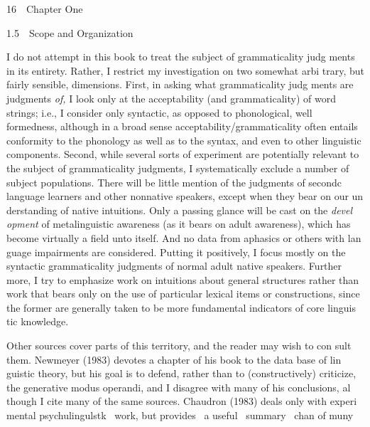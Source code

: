 \clearpage\setcounter{page}{1}\begin{styleStandard}
16\ \ Chapter One
\end{styleStandard}


\begin{styleTextbody}
1.5\ \ Scope and Organization
\end{styleTextbody}


\begin{styleStandard}
I do not attempt in this book to treat the subject of grammaticality judg\- ments in its entirety. Rather, I restrict my investigation on two somewhat arbi\- trary, but fairly sensible, dimensions. First, in asking what grammaticality judg\- ments are judgments \textit{of,}\textit{ }I look only at the acceptability (and grammaticality) of word strings; i.e., I consider only syntactic, as opposed to phonological, well\- formedness, although in a broad sense acceptability/grammaticality often entails conformity to the phonology as well as to the syntax, and even to other linguistic components. Second, while several sorts of experiment are potentially relevant to the subject of grammaticality judgments, I systematically exclude a number of subject populations. There will be little mention of the judgments of secondc language learners and other nonnative speakers, except when they bear on our un\- derstanding of native intuitions. Only a passing glance will be cast on the \textit{devel\-}\textit{ }\textit{opment}\textit{ }of metalinguistic awareness (as it bears on adult awareness), which has become virtually a field unto itself. And no data from aphasics or others with lan\- guage impairments are considered. Putting it positively, I focus mostly on the syntactic grammaticality judgments of normal adult native speakers. Further\- more, I try to emphasize work on intuitions about general structures rather than work that bears only on the use of particular lexical items or constructions, since the former are generally taken to be more fundamental indicators of core linguis\- tic knowledge.
\end{styleStandard}


\begin{styleStandard}
Other sources cover parts of this territory, and the reader may wish to con\- sult them. Newmeyer (1983) devotes a chapter of his book to the data base of lin\- guistic theory, but his goal is to defend, rather than to (constructively) criticize, the generative modus operandi, and I disagree with many of his conclusions, al\- though I cite many of the same sources. Chaudron (1983) deals only with experi\- mental psychulingulstk \ work, but provides \ a useful \ summary \ chan of muny
\end{styleStandard}


